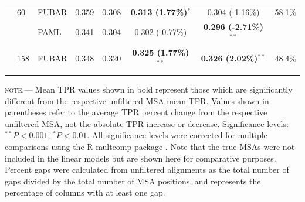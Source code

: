 \documentclass[11pt]{article}
\begin{document}
\begin{table}[htbp]
\begin{adjustwidth}{-1.5cm}{}
\begin{tabular}{l l l c c c c c}
 & 60 & FUBAR & 0.359 & 0.308 & \textbf{0.313 (1.77\%)$^{\ast}$} & 0.304 (-1.16\%) & 58.1\%\\
 & & PAML & 0.341 & 0.304 &0.302 (-0.77\%) & \textbf{0.296 (-2.71\%)$^{\ast\ast}$} & \\

 & 158 & FUBAR & 0.348 & 0.320 & \textbf{0.325 (1.77\%)$^{\ast\ast}$} & \textbf{0.326 (2.02\%)$^{\ast\ast}$} & 48.4\% \\
\noalign{\smallskip}\hline\noalign{\smallskip}
\end{tabular}
\newline
\textsc{note.}--- Mean TPR values shown in bold represent those which are significantly different from the respective unfiltered MSA mean TPR. Values shown in parentheses refer to the average TPR percent change from the respective unfiltered MSA, not the absolute TPR increase or decrease. Significance levels:  $^{\ast\ast} P < 0.001$; $^{\ast} P < 0.01$. All significance levels were corrected for multiple comparisons using the R multcomp package \citep{Hothorn2008}. Note that the true MSAs were not included in the linear models but are shown here for comparative purposes. Percent gaps were calculated from unfiltered alignments as the total number of gaps divided by the total number of MSA positions, and represents the percentage of columns with at least one gap.
\end{adjustwidth}
\end{table}
\end{document}
